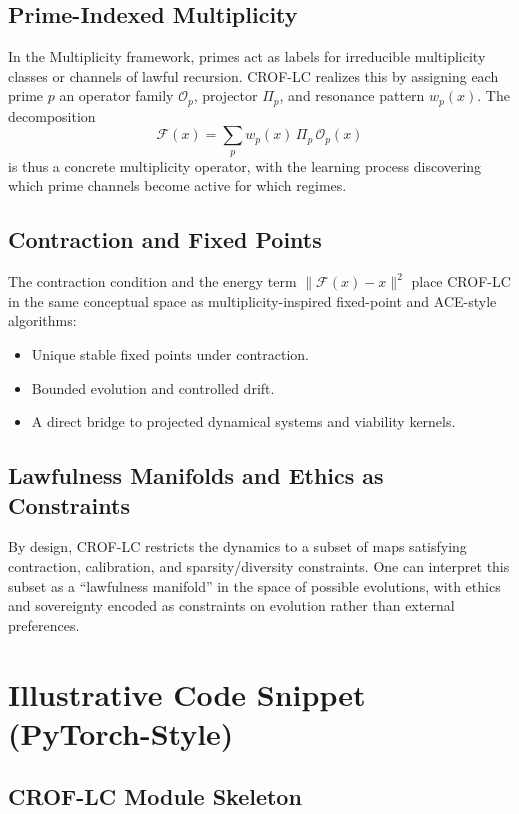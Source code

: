 \documentclass[11pt]{article}
\begin{document}
\subsection{Prime-Indexed Multiplicity}

In the Multiplicity framework, primes act as labels for irreducible multiplicity classes or channels of lawful recursion.
CROF-LC realizes this by assigning each prime \(p\) an operator family \(\mathcal{O}_p\), projector \(\Pi_p\), and resonance pattern \(w_p(x)\).
The decomposition
\[
  \mathcal{F}(x) = \sum_{p} w_p(x)\,\Pi_p\,\mathcal{O}_p(x)
\]
is thus a concrete multiplicity operator, with the learning process discovering which prime channels become active for which regimes.

\subsection{Contraction and Fixed Points}

The contraction condition and the energy term \(\|\mathcal{F}(x) - x\|^2\) place CROF-LC in the same conceptual space as multiplicity-inspired fixed-point and ACE-style algorithms:
\begin{itemize}[leftmargin=*]
  \item Unique stable fixed points under contraction.
  \item Bounded evolution and controlled drift.
  \item A direct bridge to projected dynamical systems and viability kernels.
\end{itemize}

\subsection{Lawfulness Manifolds and Ethics as Constraints}

By design, CROF-LC restricts the dynamics to a subset of maps satisfying contraction, calibration, and sparsity/diversity constraints.
One can interpret this subset as a ``lawfulness manifold'' in the space of possible evolutions, with ethics and sovereignty encoded as constraints on evolution rather than external preferences.

\section{Illustrative Code Snippet (PyTorch-Style)}

\subsection{CROF-LC Module Skeleton}
\end{document}
